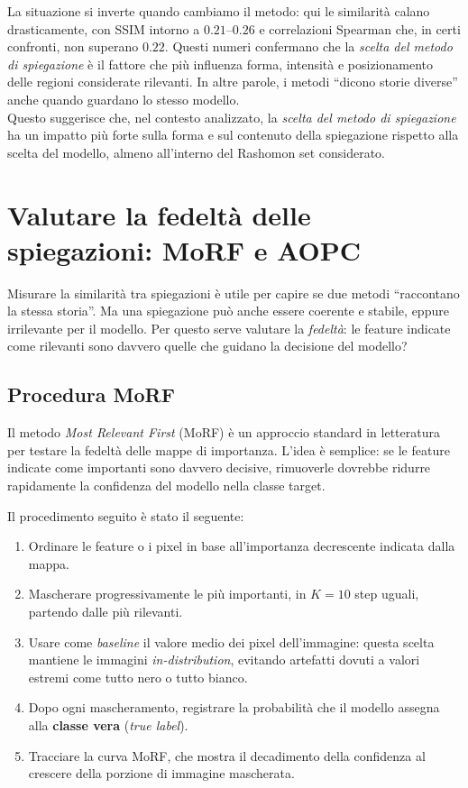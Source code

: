 \documentclass{article}
\begin{document}
La situazione si inverte quando cambiamo il metodo: qui le similarità calano
drasticamente, con SSIM intorno a $0.21$–$0.26$ e correlazioni Spearman che, in
certi confronti, non superano $0.22$. Questi numeri confermano che la
\emph{scelta del metodo di spiegazione} è il fattore che più influenza forma,
intensità e posizionamento delle regioni considerate rilevanti. In altre
parole, i metodi “dicono storie diverse” anche quando guardano lo stesso
modello.\\

Questo suggerisce che, nel contesto analizzato, la \emph{scelta del metodo di
      spiegazione} ha un impatto più forte sulla forma e sul contenuto della
spiegazione rispetto alla scelta del modello, almeno all’interno del Rashomon
set considerato.

\section{Valutare la fedeltà delle spiegazioni: MoRF e AOPC}

Misurare la similarità tra spiegazioni è utile per capire se due metodi
``raccontano la stessa storia''. Ma una spiegazione può anche essere coerente e
stabile, eppure irrilevante per il modello. Per questo serve valutare la
\emph{fedeltà}: le feature indicate come rilevanti sono davvero quelle che
guidano la decisione del modello?

\subsection{Procedura MoRF}
Il metodo \emph{Most Relevant First} (MoRF) è un approccio standard in
letteratura per testare la fedeltà delle mappe di importanza. L’idea è
semplice: se le feature indicate come importanti sono davvero decisive,
rimuoverle dovrebbe ridurre rapidamente la confidenza del modello nella classe
target.

Il procedimento seguito è stato il seguente:
\begin{enumerate}
      \item Ordinare le feature o i pixel in base all’importanza decrescente indicata dalla
            mappa.
      \item Mascherare progressivamente le più importanti, in $K=10$ step uguali, partendo
            dalle più rilevanti.
      \item Usare come \emph{baseline} il valore medio dei pixel dell’immagine: questa
            scelta mantiene le immagini \emph{in-distribution}, evitando artefatti dovuti a
            valori estremi come tutto nero o tutto bianco.
      \item Dopo ogni mascheramento, registrare la probabilità che il modello assegna alla
            \textbf{classe vera} (\textit{true label}).
      \item Tracciare la curva MoRF, che mostra il decadimento della confidenza al crescere
            della porzione di immagine mascherata.
\end{enumerate}
\end{document}
